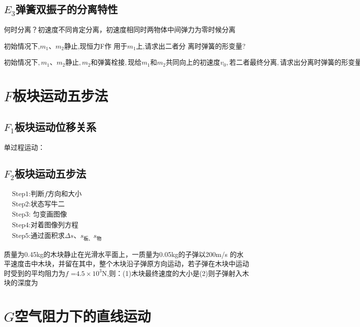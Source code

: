 \documentclass[lang=cn,10pt]{elegantbook}
\begin{document}
        \subsection{$E_{3}$弹簧双振子的分离特性}
        何时分离？初速度不同肯定分离，初速度相同时两物体中间弹力为零时候分离
        \begin{example}
        	初始情况下,$m_1$、$m_2$静止,现恒力F作 用于$m_1$上,请求出二者分 离时弹簧的形变量?
        \end{example}
        \vspace{2cm}
        \begin{example}
        	$\text{初始情况下},m_1\text{、}m_2\text{静止},m_2\text{和弹簧栓接},\text{现给}m_1\text{和}m_2\text{共同向上的初速度}v_0,\text{若二者最终分离},\text{请求出分离时弹簧的形变量。}
        	$
        \end{example}
        \vspace{2cm}
        \section{$F$板块运动五步法}
        \subsection{$F_{1}$板块运动位移关系}
        单过程运动：
        \vspace{3cm}
        \subsection{$F_{2}$板块运动五步法}
        $\begin{aligned}&\text{Step1:判断}f\text{方向和大小}\\&\text{Step2:状态写牛二}\\&\text{Step3: 匀变画图像}\\&\text{Step4:对着图像列方程}\\&\text{Step5:通过面积求}\Delta s\text{、}s_\text{板、}s_\text{物}\end{aligned}$
        \begin{example}
        	质量为0.45kg的木块静止在光滑水平面上，一质量为0.05kg的子弹以200m/s 的水平速度击中木块，并留在其中，整个木块沿子弹原方向运动，若子弹在木块中运动时受到的平均阻力为$f$ =$4.5\times10^{3}$N,则：(1)木块最终速度的大小是(2)则子弹射入木块的深度为
        \end{example}
        \vspace{3cm}
        \section{$G$空气阻力下的直线运动}
\end{document}
